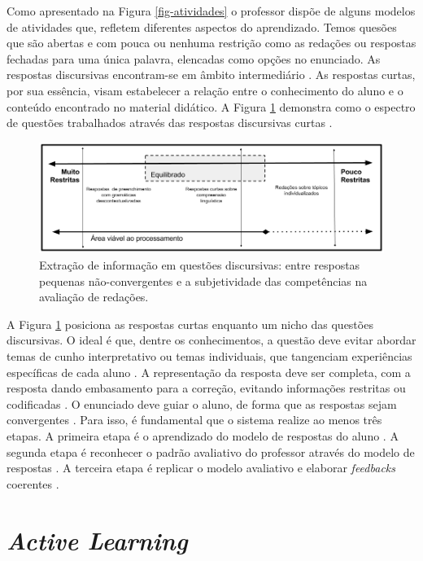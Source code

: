 Como apresentado na Figura \ref{fig-atividades} o professor dispõe de alguns modelos de atividades que, refletem diferentes aspectos do aprendizado. Temos quesões que são abertas e com pouca ou nenhuma restrição como as redações \cite{almeida-junior2017} ou respostas fechadas para uma única palavra, elencadas como opções no enunciado. As respostas discursivas encontram-se em âmbito intermediário \cite{bailey2008}. As respostas curtas, por sua essência, visam estabelecer a relação entre o conhecimento do aluno e o conteúdo encontrado no material didático. A Figura \ref{fig-SAG-concepts} demonstra como o espectro de questões trabalhados através das respostas discursivas curtas \cite{spalenza2017}.

\begin{figure}[!h]
\centering
\includegraphics[width=\textwidth]{figuras/aprendizadoSAG}
\caption{Extração de informação em questões discursivas: entre respostas pequenas não-convergentes e a subjetividade das competências na avaliação de redações.}
\label{fig-SAG-concepts}
\end{figure}

A Figura \ref{fig-SAG-concepts} posiciona as respostas curtas enquanto um nicho das questões discursivas. O ideal é que, dentre os conhecimentos, a questão deve evitar abordar temas de cunho interpretativo ou temas individuais, que tangenciam experiências específicas de cada aluno \cite{siddiqi2008}. A representação da resposta deve ser completa, com a resposta dando embasamento para a correção, evitando informações restritas ou codificadas \cite{ding2020}. O enunciado deve guiar o aluno, de forma que as respostas sejam convergentes \cite{suzen2020, filighera2020}. Para isso, é fundamental que o sistema realize ao menos três etapas. A primeira etapa é o aprendizado do modelo de respostas do aluno \cite{ramachandran2015b}. A segunda etapa é reconhecer o padrão avaliativo do professor através do modelo de respostas \cite{funayama2020}. A terceira etapa é replicar o modelo avaliativo e elaborar \textit{feedbacks} coerentes \cite{fowler2021}.


\section{\textit{Active Learning}}

